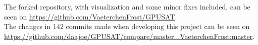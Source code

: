 \documentclass[a4paper, 12pt, bibliography=totoc]{scrartcl}
\begin{document}
The forked repository, with visualization and some minor fixes included, can be seen on \url{https://github.com/VaeterchenFrost/GPUSAT}. \\
The changes in 142 commits made when developing this project can be seen on \url{https://github.com/daajoe/GPUSAT/compare/master...VaeterchenFrost:master}.



\end{document}

